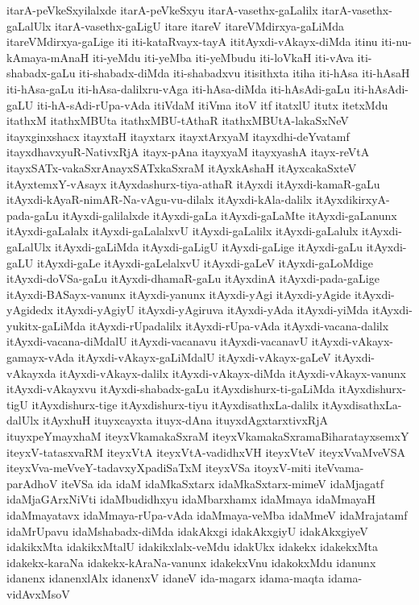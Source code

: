 {itarA-peVkeSxyilalxde
itarA-peVkeSxyu
itarA-vasethx-gaLalilx
itarA-vasethx-gaLalUlx
itarA-vasethx-gaLigU
itare
itareV
itareVMdirxya-gaLiMda
itareVMdirxya-gaLige
iti
iti-kataRvayx-tayA
ititAyxdi-vAkayx-diMda
itinu
iti-nu-kAmaya-mAnaH
iti-yeMdu
iti-yeMba
iti-yeMbudu
iti-loVkaH
iti-vAva
iti-shabadx-gaLu
iti-shabadx-diMda
iti-shabadxvu
itisithxta
itiha
iti-hAsa
iti-hAsaH
iti-hAsa-gaLu
iti-hAsa-dalilxru-vAga
iti-hAsa-diMda
iti-hAsAdi-gaLu
iti-hAsAdi-gaLU
iti-hA-sAdi-rUpa-vAda
itiVdaM
itiVma
itoV
itf
itatxlU
itutx
itetxMdu
itathxM
itathxMBUta
itathxMBU-tAthaR
itathxMBUtA-lakaSxNeV
itayxginxshacx
itayxtaH
itayxtarx
itayxtArxyaM
itayxdhi-deYvatamf
itayxdhavxyuR-NativxRjA
itayx-pAna
itayxyaM
itayxyashA
itayx-reVtA
itayxSATx-vakaSxrAnayxSATxkaSxraM
itAyxkAshaH
itAyxcakaSxteV
itAyxtemxY-vAsayx
itAyxdashurx-tiya-athaR
itAyxdi
itAyxdi-kamaR-gaLu
itAyxdi-kAyaR-nimAR-Na-vAgu-vu-dilalx
itAyxdi-kAla-dalilx
itAyxdikirxyA-pada-gaLu
itAyxdi-galilalxde
itAyxdi-gaLa
itAyxdi-gaLaMte
itAyxdi-gaLanunx
itAyxdi-gaLalalx
itAyxdi-gaLalalxvU
itAyxdi-gaLalilx
itAyxdi-gaLalulx
itAyxdi-gaLalUlx
itAyxdi-gaLiMda
itAyxdi-gaLigU
itAyxdi-gaLige
itAyxdi-gaLu
itAyxdi-gaLU
itAyxdi-gaLe
itAyxdi-gaLelalxvU
itAyxdi-gaLeV
itAyxdi-gaLoMdige
itAyxdi-doVSa-gaLu
itAyxdi-dhamaR-gaLu
itAyxdinA
itAyxdi-pada-gaLige
itAyxdi-BASayx-vanunx
itAyxdi-yanunx
itAyxdi-yAgi
itAyxdi-yAgide
itAyxdi-yAgidedx
itAyxdi-yAgiyU
itAyxdi-yAgiruva
itAyxdi-yAda
itAyxdi-yiMda
itAyxdi-yukitx-gaLiMda
itAyxdi-rUpadalilx
itAyxdi-rUpa-vAda
itAyxdi-vacana-dalilx
itAyxdi-vacana-diMdalU
itAyxdi-vacanavu
itAyxdi-vacanavU
itAyxdi-vAkayx-gamayx-vAda
itAyxdi-vAkayx-gaLiMdalU
itAyxdi-vAkayx-gaLeV
itAyxdi-vAkayxda
itAyxdi-vAkayx-dalilx
itAyxdi-vAkayx-diMda
itAyxdi-vAkayx-vanunx
itAyxdi-vAkayxvu
itAyxdi-shabadx-gaLu
itAyxdishurx-ti-gaLiMda
itAyxdishurx-tigU
itAyxdishurx-tige
itAyxdishurx-tiyu
itAyxdisathxLa-dalilx
itAyxdisathxLa-dalUlx
itAyxhuH
ituyxcayxta
ituyx-dAna
ituyxdAgxtarxtivxRjA
ituyxpeYmayxhaM
iteyxVkamakaSxraM
iteyxVkamakaSxramaBiharatayxsemxY
iteyxV-tatasxvaRM
iteyxVtA
iteyxVtA-vadidhxVH
iteyxVteV
iteyxVvaMveVSA
iteyxVva-meVveY-tadavxyXpadiSaTxM
iteyxVSa
itoyxV-miti
iteVvama-parAdhoV
iteVSa
ida
idaM
idaMkaSxtarx
idaMkaSxtarx-mimeV
idaMjagatf
idaMjaGArxNiVti
idaMbudidhxyu
idaMbarxhamx
idaMmaya
idaMmayaH
idaMmayatavx
idaMmaya-rUpa-vAda
idaMmaya-veMba
idaMmeV
idaMrajatamf
idaMrUpavu
idaMshabadx-diMda
idakAkxgi
idakAkxgiyU
idakAkxgiyeV
idakikxMta
idakikxMtalU
idakikxlalx-veMdu
idakUkx
idakekx
idakekxMta
idakekx-karaNa
idakekx-kAraNa-vanunx
idakekxVnu
idakokxMdu
idanunx
idanenx
idanenxlAlx
idanenxV
idaneV
ida-magarx
idama-maqta
idama-vidAvxMsoV
}
